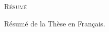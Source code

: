 \begin{center}
  {\Huge \textsc{Résumé}}
\end{center}
%
\noindent
%
Résumé de la Thèse en Français.

\newpage
\null
\thispagestyle{empty}
\newpage
